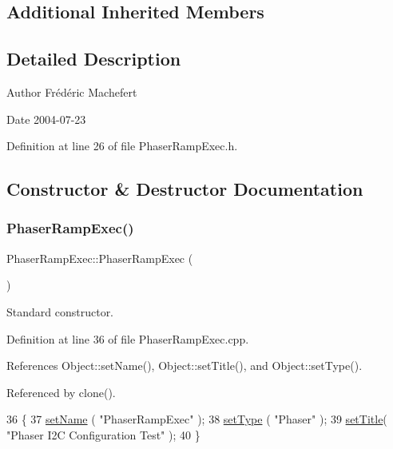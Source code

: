 \subsection*{Additional Inherited Members}


\subsection{Detailed Description}
\begin{DoxyAuthor}{Author}
Frédéric Machefert 
\end{DoxyAuthor}
\begin{DoxyDate}{Date}
2004-\/07-\/23 
\end{DoxyDate}


Definition at line 26 of file Phaser\+Ramp\+Exec.\+h.



\subsection{Constructor \& Destructor Documentation}
\mbox{\label{classPhaserRampExec_a26f14f1c66dd37251374998ae0a4f02a}} 
\subsubsection{\texorpdfstring{Phaser\+Ramp\+Exec()}{PhaserRampExec()}}
{\footnotesize\ttfamily Phaser\+Ramp\+Exec\+::\+Phaser\+Ramp\+Exec (\begin{DoxyParamCaption}{ }\end{DoxyParamCaption})}



Standard constructor. 



Definition at line 36 of file Phaser\+Ramp\+Exec.\+cpp.



References Object\+::set\+Name(), Object\+::set\+Title(), and Object\+::set\+Type().



Referenced by clone().


\begin{DoxyCode}
36                                  \{
37   \hyperlink{classObject_ae30fea75683c2d149b6b6d17c09ecd0c}{setName} ( \textcolor{stringliteral}{"PhaserRampExec"} );
38   \hyperlink{classObject_aae534cc9d982bcb9b99fd505f2e103a5}{setType} ( \textcolor{stringliteral}{"Phaser"} );
39   \hyperlink{classObject_a89557dbbad5bcaa02652f5d7fa35d20f}{setTitle}( \textcolor{stringliteral}{"Phaser I2C Configuration Test"} );
40 \}
\end{DoxyCode}
\mbox{\label{classPhaserRampExec_a0ea95adf577ff47f09068a20329f1598}} 
